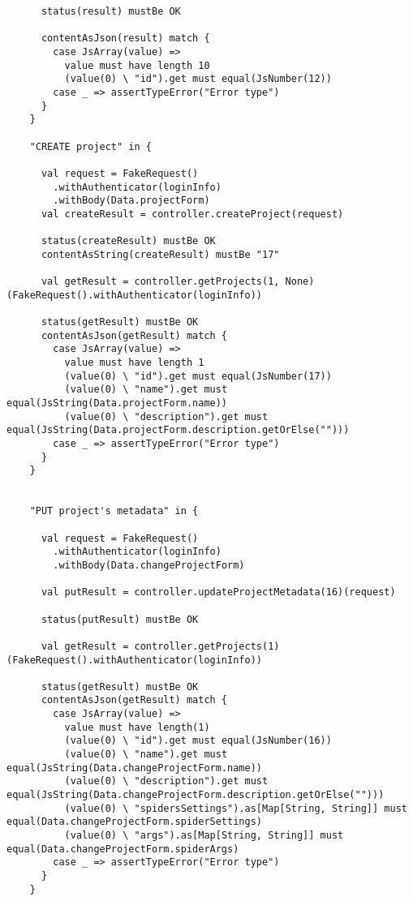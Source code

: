 \begin{lstlisting}
      status(result) mustBe OK

      contentAsJson(result) match {
        case JsArray(value) =>
          value must have length 10
          (value(0) \ "id").get must equal(JsNumber(12))
        case _ => assertTypeError("Error type")
      }
    }

    "CREATE project" in {

      val request = FakeRequest()
        .withAuthenticator(loginInfo)
        .withBody(Data.projectForm)
      val createResult = controller.createProject(request)

      status(createResult) mustBe OK
      contentAsString(createResult) mustBe "17"

      val getResult = controller.getProjects(1, None)(FakeRequest().withAuthenticator(loginInfo))

      status(getResult) mustBe OK
      contentAsJson(getResult) match {
        case JsArray(value) =>
          value must have length 1
          (value(0) \ "id").get must equal(JsNumber(17))
          (value(0) \ "name").get must equal(JsString(Data.projectForm.name))
          (value(0) \ "description").get must equal(JsString(Data.projectForm.description.getOrElse("")))
        case _ => assertTypeError("Error type")
      }
    }


    "PUT project's metadata" in {

      val request = FakeRequest()
        .withAuthenticator(loginInfo)
        .withBody(Data.changeProjectForm)

      val putResult = controller.updateProjectMetadata(16)(request)

      status(putResult) mustBe OK

      val getResult = controller.getProjects(1)(FakeRequest().withAuthenticator(loginInfo))

      status(getResult) mustBe OK
      contentAsJson(getResult) match {
        case JsArray(value) =>
          value must have length(1)
          (value(0) \ "id").get must equal(JsNumber(16))
          (value(0) \ "name").get must equal(JsString(Data.changeProjectForm.name))
          (value(0) \ "description").get must equal(JsString(Data.changeProjectForm.description.getOrElse("")))
          (value(0) \ "spidersSettings").as[Map[String, String]] must equal(Data.changeProjectForm.spiderSettings)
          (value(0) \ "args").as[Map[String, String]] must equal(Data.changeProjectForm.spiderArgs)
        case _ => assertTypeError("Error type")
      }
    }


\end{lstlisting}
